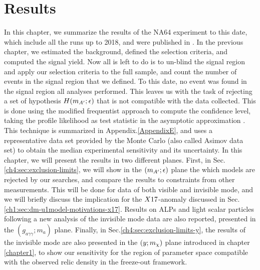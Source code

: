 
\newcommand{\pdirfour}{chapters/plots/chapter4}

\chapter{Results} %

\label{chapter4} %

In this chapter, we summarize the results of the NA64 experiment to this date, which include all the runs up to 2018, and were published in \cite{Banerjee:2020fue,Banerjee:2019hmi,NA64:2019imj,na64-prd,Banerjee:2018vgk,Banerjee:2016tad}. In the previous chapter, we estimated the background, defined the selection criteria, and computed the signal yield. Now all is left to do is to un-blind the signal region and apply our selection criteria to the full sample, and count the number of events in the signal region that we defined. To this date, no event was found in the signal region all analyses performed. This leaves us with the task of rejecting a set of hypothesis $H(m_{A'};\epsilon)$ that is not compatible with the data collected. This is done using the modified frequentist approach to compute the confidence level, taking the profile likelihood as test statistic in the asymptotic approximation \cite{Read_2002,JUNK1999435,Cowan:2010js}. This technique is summarized in Appendix.\ref{AppendixE}, and uses a representative data set provided by the Monte Carlo (also called Asimov data set) to obtain the median experimental sensitivity and its uncertainty. In this chapter, we will present the results in two different planes. First, in Sec.\ref{ch4:sec:exclusion-limits}, we will show in the $(m_{A'};\epsilon)$ plane the which models are rejected by our searches, and compare the results to constraints from other measurements. This will be done for data of both visible and invisible mode, and we will briefly discuss the implication for the $X17$-anomaly discussed in Sec.\ref{ch1:sec:dm-u1model-motivations-x17}. Results on ALPs and light scalar particles following a new analysis of the invisible mode data are also reported, presented in the $(g_{a\gamma \gamma};m_a)$ plane. Finally, in Sec.\ref{ch4:sec:exclusion-limits-y}, the results of the invisible mode are also presented in the $(y;m_{\chi})$ plane introduced in chapter \ref{chapter1}, to show our sensitivity for the region of parameter space compatible with the observed relic density in the freeze-out framework.

